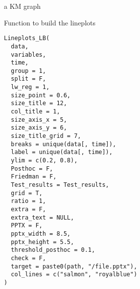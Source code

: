 \documentclass[a4paper]{book}
\begin{document}
%
\begin{Value}
a KM graph
\end{Value}
%
\begin{Description}
Function to build the lineplots
\end{Description}
%
\begin{Usage}
\begin{verbatim}
Lineplots_LB(
  data,
  variables,
  time,
  group = 1,
  split = F,
  lw_reg = 1,
  size_point = 0.6,
  size_title = 12,
  col_title = 1,
  size_axis_x = 5,
  size_axis_y = 6,
  size_title_grid = 7,
  breaks = unique(data[, time]),
  label = unique(data[, time]),
  ylim = c(0.2, 0.8),
  Posthoc = F,
  Friedman = F,
  Test_results = Test_results,
  grid = T,
  ratio = 1,
  extra = F,
  extra_text = NULL,
  PPTX = F,
  pptx_width = 8.5,
  pptx_height = 5.5,
  threshold_posthoc = 0.1,
  check = F,
  target = paste0(path, "/file.pptx"),
  col_lines = c("salmon", "royalblue")
)
\end{verbatim}
\end{Usage}
%
\end{document}
